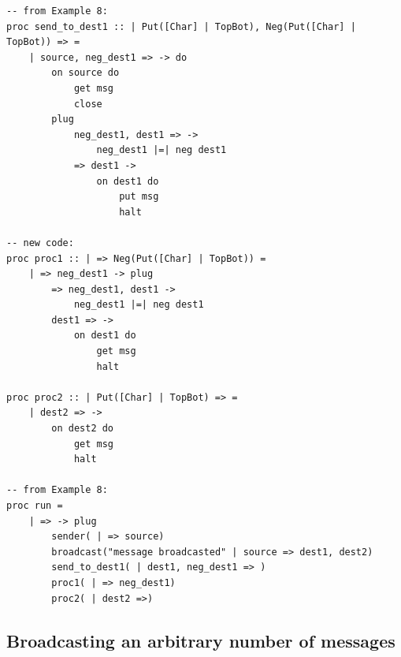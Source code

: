 \documentclass[acmsmall]{acmart}
\begin{document}
\begin{appendix}
\begin{lstlisting}
-- from Example 8:
proc send_to_dest1 :: | Put([Char] | TopBot), Neg(Put([Char] | TopBot)) => =
	| source, neg_dest1 => -> do
		on source do
			get msg
			close
		plug
			neg_dest1, dest1 => ->
				neg_dest1 |=| neg dest1
			=> dest1 ->
				on dest1 do	
					put msg
					halt
					
-- new code:
proc proc1 :: | => Neg(Put([Char] | TopBot)) =
	| => neg_dest1 -> plug
		=> neg_dest1, dest1 ->
			neg_dest1 |=| neg dest1
		dest1 => ->
			on dest1 do	
				get msg
				halt

proc proc2 :: | Put([Char] | TopBot) => =
	| dest2 => ->
		on dest2 do
			get msg
			halt

-- from Example 8:
proc run =
	| => -> plug
		sender( | => source)
		broadcast("message broadcasted" | source => dest1, dest2)
		send_to_dest1( | dest1, neg_dest1 => )
		proc1( | => neg_dest1)	
		proc2( | dest2 =>)
\end{lstlisting} 

\subsection{Broadcasting an arbitrary number of messages}
\label{prog:broadcastmsgs}


\end{appendix}
\end{document}
